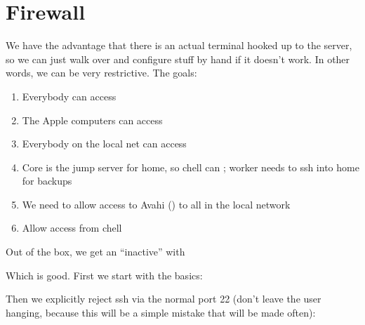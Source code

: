 \documentclass[a4paper,10pt,english]{sphinxmanual}
\begin{document}
\chapter{Firewall}
\label{\detokenize{firewall:firewall}}\label{\detokenize{firewall::doc}}
We have the advantage that there is an actual terminal hooked up to the server,
so we can just walk over and configure stuff by hand if it doesn’t work. In
other words, we can be very restrictive. The goals:
\begin{enumerate}
\def\theenumi{\arabic{enumi}}
\def\labelenumi{\theenumi .}
\makeatletter\def\p@enumii{\p@enumi \theenumi .}\makeatother
\item {} 
Everybody can access 

\item {} 
The Apple computers can access 

\item {} 
Everybody on the local net can access 

\item {} 
Core is the jump server for home, so chell can ; worker needs to ssh into home for backups

\item {} 
We need to allow access to Avahi () to all in the local network

\item {} 
Allow  access from chell

\end{enumerate}

Out of the box, we get an “inactive” with

\begin{sphinxVerbatim}[commandchars=\\\{\}]
  
\end{sphinxVerbatim}

Which is good. First we start with the basics:

\begin{sphinxVerbatim}[commandchars=\\\{\}]
    
    
\end{sphinxVerbatim}

Then we explicitly reject ssh via the normal port 22 (don’t leave the user
hanging, because this will be a simple mistake that will be made often):
\end{document}
